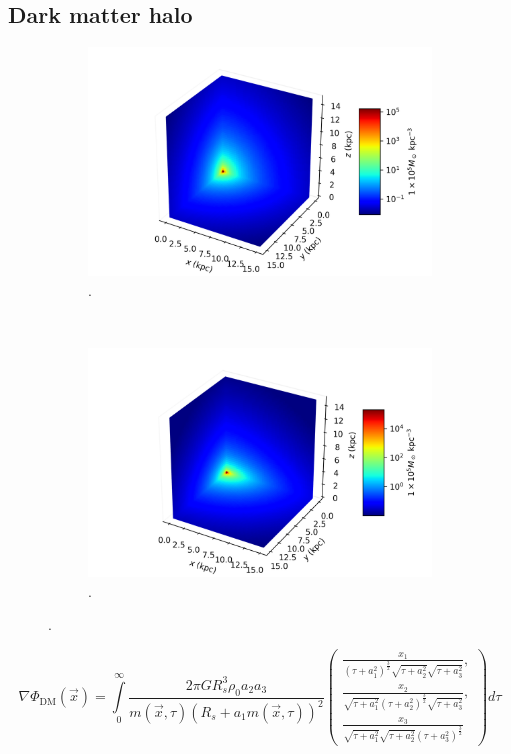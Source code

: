 	\subsection{Dark matter halo}
	\begin{figure}[h]
		\centering
		\begin{subfigure}[b]{0.49\textwidth}
			\includegraphics[width = \textwidth]{"../Files/Week 7/symmetric"}
			\caption{.}
			\label{fig: symmetricDensity3d}
		\end{subfigure}
		~ 
		\begin{subfigure}[b]{0.49\textwidth}
			\includegraphics[width=\textwidth]{"../Files/Week 7/triaxial"}
			\caption{.}
			\label{fig: triaxialDensity3d}
		\end{subfigure}
		\caption{.}
		\label{fig: symmetricTriaxial}
	\end{figure}
	\begin{equation}
		\nabla \Phi_\text{DM}(\vec{x}) = 
		\int\limits_{0}^{\infty}\dfrac{2 \pi G R_{s}^{3} \rho_0 a_{2} a_{3}}{m(\vec{x}, \tau)\left(R_{s} + a_{1} m(\vec{x}, \tau)\right)^{2}} \left(\begin{array}{l}
		\frac{x_1}{\left(\tau + a_{1}^{2}\right)^{\frac{3}{2}} \sqrt{\tau + a_{2}^{2}} \sqrt{\tau + a_{3}^{2}}}, \\
		\frac{x_2}{\sqrt{\tau + a_{1}^{2}} \left(\tau + a_{2}^{2}\right)^{\frac{3}{2}} \sqrt{\tau + a_{3}^{2}}}, \\
		\frac{x_3}{\sqrt{\tau + a_{1}^{2}} \sqrt{\tau + a_{2}^{2}} \left(\tau + a_{3}^{2}\right)^{\frac{3}{2}}}
		\end{array}\right)
		d\tau
	\end{equation}
